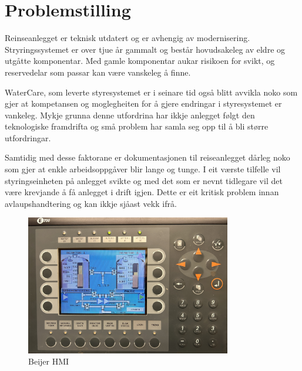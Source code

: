 \section{Problemstilling}
Reinseanlegget er teknisk utdatert og er avhengig av modernisering. Stryringssystemet er over tjue år gammalt
og består hovudsakeleg av eldre og utgåtte komponentar. Med gamle komponentar aukar risikoen for svikt, 
og reservedelar som passar kan være vanskeleg å finne.

WaterCare, som leverte styresystemet er i seinare tid også blitt avvikla noko som gjer at kompetansen 
og moglegheiten for å gjere endringar i styresystemet er vankeleg. 
Mykje grunna denne utfordrina har ikkje anlegget følgt den teknologiske framdrifta 
og små problem har samla seg opp til å bli større utfordringar.

Samtidig med desse faktorane er dokumentasjonen til reiseanlegget dårleg noko som gjer at enkle arbeidsoppgåver blir lange og tunge.
I eit værste tilfelle vil styringseinheten på anlegget svikte og med det som er nevnt tidlegare vil det være krevjande
å få anlegget i drift igjen. Dette er eit kritisk problem innan avlaupshandtering og kan ikkje sjåast vekk ifrå.
\newline

\begin{figure}[htbp]
    \centering
    \includegraphics[width=0.8\textwidth]{Bilder/BeijerSkjerm.JPG}
    \caption{Beijer HMI}\label{fig:HMI}
\end{figure}